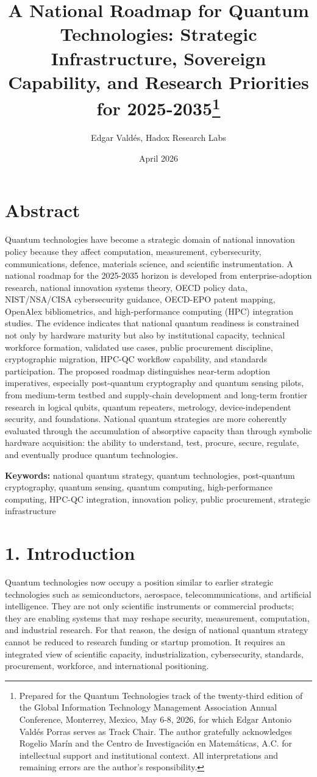 \documentclass[
  11pt,
  letterpaper,
]{article}
\title{A National Roadmap for Quantum Technologies: Strategic
Infrastructure, Sovereign Capability, and Research Priorities for
2025-2035\thanks{Prepared for the Quantum Technologies track of the
twenty-third edition of the Global Information Technology Management
Association Annual Conference, Monterrey, Mexico, May 6-8, 2026, for
which Edgar Antonio Valdés Porras serves as Track Chair. The author
gratefully acknowledges Rogelio Marín and the Centro de Investigación en
Matemáticas, A.C. for intellectual support and institutional context.
All interpretations and remaining errors are the author's
responsibility.}}
\author{Edgar Valdés, Hadox Research Labs}
\date{April 2026}
\begin{document}
\maketitle

\section{Abstract}\label{abstract}

Quantum technologies have become a strategic domain of national
innovation policy because they affect computation, measurement,
cybersecurity, communications, defence, materials science, and
scientific instrumentation. A national roadmap for the 2025-2035 horizon
is developed from enterprise-adoption research, national innovation
systems theory, OECD policy data, NIST/NSA/CISA cybersecurity guidance,
OECD-EPO patent mapping, OpenAlex bibliometrics, and high-performance
computing (HPC) integration studies. The evidence indicates that
national quantum readiness is constrained not only by hardware maturity
but also by institutional capacity, technical workforce formation,
validated use cases, public procurement discipline, cryptographic
migration, HPC-QC workflow capability, and standards participation. The
proposed roadmap distinguishes near-term adoption imperatives,
especially post-quantum cryptography and quantum sensing pilots, from
medium-term testbed and supply-chain development and long-term frontier
research in logical qubits, quantum repeaters, metrology,
device-independent security, and foundations. National quantum
strategies are more coherently evaluated through the accumulation of
absorptive capacity than through symbolic hardware acquisition: the
ability to understand, test, procure, secure, regulate, and eventually
produce quantum technologies.

\textbf{Keywords:} national quantum strategy, quantum technologies,
post-quantum cryptography, quantum sensing, quantum computing,
high-performance computing, HPC-QC integration, innovation policy,
public procurement, strategic infrastructure

\section{1. Introduction}\label{introduction}

Quantum technologies now occupy a position similar to earlier strategic
technologies such as semiconductors, aerospace, telecommunications, and
artificial intelligence. They are not only scientific instruments or
commercial products; they are enabling systems that may reshape
security, measurement, computation, and industrial research. For that
reason, the design of national quantum strategy cannot be reduced to
research funding or startup promotion. It requires an integrated view of
scientific capacity, industrialization, cybersecurity, standards,
procurement, workforce, and international positioning.
\end{document}
